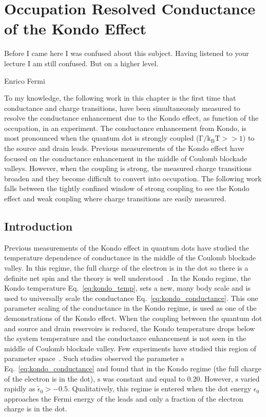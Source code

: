 \chapter[Occupation Resolved Conductance of the Kondo Effect]{Occupation Resolved Conductance of the Kondo Effect}\label{cha:mixed_valence_conductance}

\epigraph{Before I came here I was confused about this subject. Having listened to your lecture I am still confused. But on a higher level.}{Enrico Fermi}

To my knowledge, the following work in this chapter is the first time that conductance and charge transitions, have been simultaneously measured to resolve the conductance enhancement due to the Kondo effect, as function of the occupation, in an experiment. The conductance enhancement from Kondo, is most pronounced when the quantum dot is strongly coupled ($\mathrm{\Gamma/k_BT}>>1$) to the source and drain leads. Previous measurements of the Kondo effect have focused on the conductance enhancement in the middle of Coulomb blockade valleys. However, when the coupling is strong, the measured charge transitions broaden and they become difficult to convert into occupation. The following work falls between the tightly confined window of strong coupling to see the Kondo effect and weak coupling where charge transitions are easily measured. 

\section{Introduction}
Previous measurements of the Kondo effect in quantum dots have studied the temperature dependence of conductance in the middle of the Coulomb blockade valley. In this regime, the full charge of the electron is in the dot so there is a definite net spin and the theory is well understood~\cite{kondo_unitary, costi_kondo_mv_eo_regime}. In the Kondo regime, the Kondo temperature Eq.~\ref{eq:kondo_temp}, sets a new, many body scale and is used to universally scale the conductance Eq.~\ref{eq:kondo_conductance}. This one parameter scaling of the conductance in the Kondo regime, is used as one of the demonstrations of the Kondo effect. When the coupling between the quantum dot and source and drain reservoirs is reduced, the Kondo temperature drops below the system temperature and the conductance enhancement is not seen in the middle of Coulomb blockade valley. Few experiments have studied this region of parameter space~\cite{goldhaber_mv}. Such studies observed the parameter $\mathrm{s}$ Eq.~\ref{eq:kondo_conductance} and found that in the Kondo regime (the full charge of the electron is in the dot), $\mathrm{s}$ was constant and equal to $0.20$. However, $\mathrm{s}$ varied rapidly as $\tilde{\epsilon}_0>-0.5$. Qualitatively, this regime is entered when the dot energy $\epsilon_0$ approaches the Fermi energy of the leads and only a fraction of the electron charge is in the dot. 


